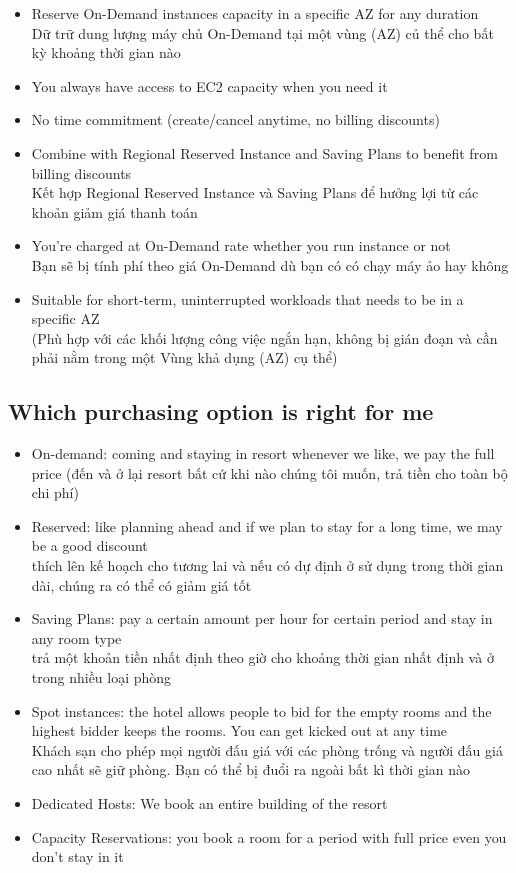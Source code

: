 \begin{itemize}
	\item Reserve On-Demand instances capacity in a specific AZ for any duration \\ Dữ trữ dung lượng máy chủ On-Demand tại một vùng (AZ) củ thể cho bất kỳ khoảng thời gian nào
	\item You always have access to EC2 capacity when you need it
	\item No time commitment (create/cancel anytime, no billing discounts)
	\item Combine with Regional Reserved Instance and Saving Plans to benefit from billing discounts \\ Kết hợp Regional Reserved Instance và Saving Plans để hưởng lợi từ các khoản giảm giá thanh toán
	\item You're charged at On-Demand rate whether you run instance or not \\ Bạn sẽ bị tính phí theo giá On-Demand dù bạn có có chạy máy ảo hay không
	\item Suitable for short-term, uninterrupted workloads that needs to be in a specific AZ \\ (Phù hợp với các khối lượng công việc ngắn hạn, không bị gián đoạn và cần phải nằm trong một Vùng khả dụng (AZ) cụ thể)
\end{itemize}

\subsection{Which purchasing option is right for me}

\begin{itemize}
	\item On-demand: coming and staying in resort whenever we like, we pay the full price (đến và ở lại resort bất cứ khi nào chúng tôi muốn, trả tiền cho toàn bộ chi phí)
	\item Reserved: like planning ahead and if we plan to stay for a long time, we may be a good discount \\ thích lên kế hoạch cho tương lai và nếu có dự định ở sử dụng trong thời gian dài, chúng ra có thể có giảm giá tốt
	\item Saving Plans: pay a certain amount per hour for certain period and stay in any room type \\ trả một khoản tiền nhất định theo giờ cho khoảng thời gian nhất định và ở trong nhiều loại phòng
	\item Spot instances: the hotel allows people to bid for the empty rooms and the highest bidder keeps the rooms. You can get kicked out at any time \\ Khách sạn cho phép mọi người đấu giá với các phòng trống và người đấu giá cao nhất sẽ giữ phòng. Bạn có thể bị đuổi ra ngoài bất kì thời gian nào
	\item Dedicated Hosts: We book an entire building of the resort
	\item Capacity Reservations: you book a room for a period with full price even you don't stay in it
\end{itemize}

